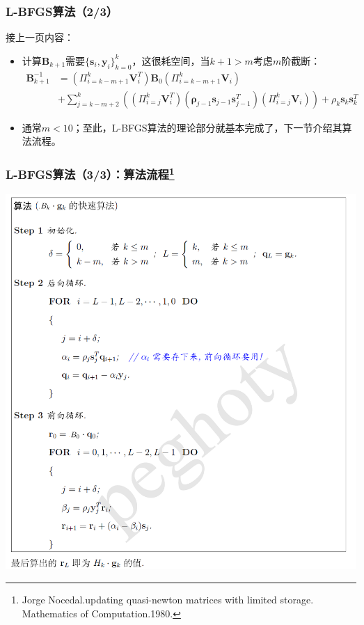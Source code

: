 \documentclass{beamer}
\begin{document}
\begin{frame}\frametitle{L-BFGS算法（2/3）}
接上一页内容：
\begin{itemize}
\item 计算$\bm{B}_{k+1}$需要$\{\bm{s}_i,\bm{y}_i\}_{k=0}^{k}$，这很耗空间，当$k+1>m$考虑$m$阶截断：
\begin{displaymath}
\begin{split}
\bm{B}_{k+1}^{-1}&=\left(\Pi_{i=k-m+1}^{k}\bm{V}_{i}^{T}\right)\bm{B}_{0}\left(\Pi_{i=k-m+1}^{k}\bm{V}_{i}\right)\\
&+\sum_{j=k-m+2}^{k}\left(\left(\Pi_{i=j}^{k}\bm{V}_{i}^{T}\right)(\bm{\rho}_{j-1}\bm{s}_{j-1}\bm{s}_{j-1}^{T})\left(\Pi_{i=j}^{k}\bm{V}_{i}\right)\right)+\rho_{k}\bm{s}_k\bm{s}_{k}^{T}
\end{split}
\end{displaymath}
\item 通常$m<10$；至此，L-BFGS算法的理论部分就基本完成了，下一节介绍其算法流程。
\end{itemize}
\end{frame}
\begin{frame}\frametitle{L-BFGS算法（3/3）：算法流程\footnote{ Jorge Nocedal.updating quasi-newton matrices with limited storage. Mathematics of Computation.1980.}}
\vspace{-3mm}
\begin{center}
\includegraphics[width=0.54\linewidth]{Images/L-BFGS.png}
\end{center}
\end{frame}
\end{document}
